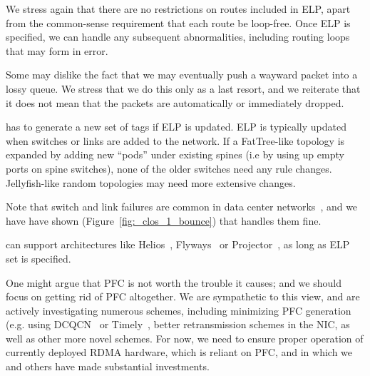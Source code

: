 We stress again that there are no restrictions on routes included in ELP, apart
from the common-sense requirement that each route be loop-free. Once ELP is
specified, we can handle any subsequent abnormalities, including routing loops
that may form in error.

 Some may dislike the fact that we may eventually push
a wayward packet into a lossy queue. We stress that we do this only as a last
resort, and we reiterate that it does not mean that the packets are
automatically or immediately dropped.

 \sysname{} has to generate a new set of tags if ELP is
updated.  ELP is typically updated when switches or links are added to the
network. If a FatTree-like topology is expanded by adding new ``pods'' under
existing spines (i.e by using up empty ports on spine switches), none of the
older switches need any rule changes.  Jellyfish-like random topologies may need
more extensive changes.

Note that switch and link failures are common in data center
networks~\cite{netpilot}, and we have have shown
(Figure~\ref{fig:_clos_1_bounce}) that \sysname{} handles them fine. 

 \sysname{} can support architectures
like Helios~\cite{helios}, Flyways~\cite{flyway} or Projector~\cite{projector},
as long as ELP set is specified.

 One might argue that PFC is not worth the trouble it
causes; and we should focus on getting rid of PFC altogether.  We are
sympathetic to this view, and are actively investigating numerous schemes,
including minimizing PFC generation (e.g.  using DCQCN~\cite{dcqcn} or
Timely~\cite{timely}, better retransmission schemes in the NIC, as well as other
more novel schemes.  For now, we need \sysname{} to ensure proper operation of
currently deployed RDMA hardware, which is reliant on PFC, and in which we and
others have made substantial investments.

